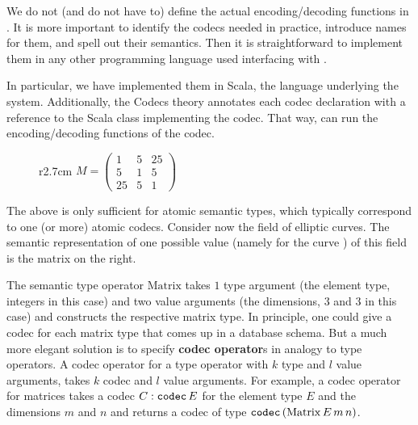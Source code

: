 We do not (and do not have to) define the actual encoding/decoding functions in \ommt.
It is more important to identify the codecs needed in practice, introduce names for them, and spell out their semantics.
Then it is straightforward to implement them in any other programming language used interfacing with \lmfdb.

In particular, we have implemented them in Scala, the language underlying the \mmt system.
Additionally, the \textsf{Codecs} theory annotates each codec declaration with a reference to the Scala class implementing the codec.
That way, \mmt can run the encoding/decoding functions of the codec.

\begin{wrapfigure}r{2.7cm}\vspace*{-2em}
$M = \left(
    \begin{array}{ccc}
      1 & 5 & 25 \\
      5 & 1 & 5 \\
      25 & 5 & 1 \end{array} 
  \right)$\vspace*{-1.5em}
\end{wrapfigure}

The above is only sufficient for atomic semantic types, which typically correspond to one (or more) atomic codecs.
Consider now the field  of elliptic curves.
The semantic representation of one possible value (namely for the curve ) of this field is the matrix on the right.

The semantic type operator $\mathrm{Matrix}$ takes $1$ type argument (the element type, integers in this case) and two value arguments (the dimensions, $3$ and $3$ in this case) and constructs the respective matrix type. 
In principle, one could give a codec for each matrix type that comes up in a database schema. 
But a much more elegant solution is to specify \textbf{codec operator}s in analogy to type operators.
A codec operator for a type operator with $k$ type and $l$ value arguments, takes $k$ codec and $l$ value arguments.
For example, a codec operator for matrices takes a codec $C:\codectt\, E$ for the element type $E$ and the dimensions $m$ and $n$ and returns a codec of type $\codectt\,(\mathrm{Matrix}\,E\,m\,n)$.


